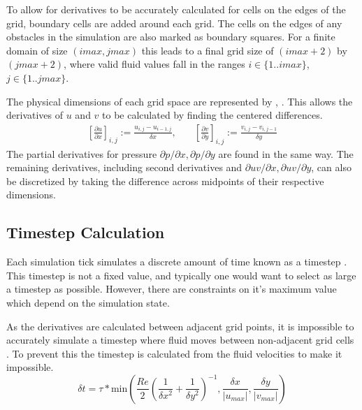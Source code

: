 To allow for derivatives to be accurately calculated for cells on the edges of the grid, boundary cells are added around each grid.%
The cells on the edges of any obstacles in the simulation are also marked as boundary squares.
For a finite domain of size $(imax, jmax)$ this leads to a final grid size of $(imax + 2)$ by $(jmax + 2)$, where valid fluid values fall in the ranges %
$i \in \{1..imax\}$, $j \in \{1..jmax\}$.

The physical dimensions of each grid space are represented by \deltaX{}, \deltaY{}.
This allows the derivatives of $u$ and $v$ to be calculated by finding the centered differences.
\begin{align}
    \left[\frac{\partial{u}}{\partial{x}}\right]_{i,j} := \frac{u_{i,j}-u_{i-1,j}}{\delta{x}}, 
    & \quad %
    \left[\frac{\partial{v}}{\partial{y}}\right]_{i,j} := \frac{v_{i,j}-v_{i,j-1}}{\delta{y}}
\end{align}
The partial derivatives for pressure $\partial{p}/\partial{x}, \partial{p}/\partial{y}$ are found in the same way.
The remaining derivatives, including second derivatives and $\partial{uv}/\partial{x}, \partial{uv}/\partial{y}$, can also be discretized by taking the difference across midpoints of their respective dimensions\cite{hirt1976}.
%

\subsection{Timestep Calculation}
\label{sec:TimestepCalculation}
Each simulation tick simulates a discrete amount of time known as a timestep \deltaT{}.
This timestep is not a fixed value, and typically one would want to select as large a timestep as possible.
However, there are constraints on it's maximum value which depend on the simulation state.

As the derivatives are calculated between adjacent grid points, it is impossible to accurately simulate a timestep where fluid moves between non-adjacent grid cells .
To prevent this the timestep \deltaT{} is calculated from the fluid velocities to make it impossible.
\begin{equation}
    \delta{t} = \tau * \text{min}\left(
        \frac{Re}{2}\left(
            \frac{1}{\delta{x}^2} + \frac{1}{\delta{y}^2}
        \right)^{-1},
        \frac{\delta{x}}{|u_{max}|},
        \frac{\delta{y}}{|v_{max}|}
    \right)
\end{equation}

